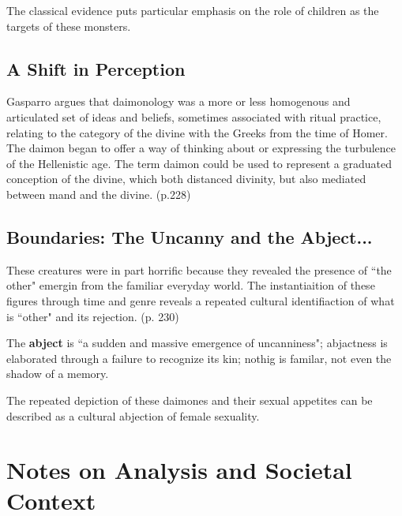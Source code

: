 \begin{nte}
    The classical evidence puts particular emphasis on the role of children as the targets of these monsters.
\end{nte}


\subsection{A Shift in Perception}

Gasparro argues that daimonology was a more or less homogenous and articulated set of ideas and beliefs, sometimes associated with ritual practice, relating to the category of the divine with the Greeks from the time of Homer. The daimon began to offer a way of thinking about or expressing the turbulence of the Hellenistic age. The term daimon could be used to represent a graduated conception of the divine, which both distanced divinity, but also mediated between mand and the divine. (p.228)


\subsection{Boundaries: The Uncanny and the Abject...}

These creatures were in part horrific because they revealed the presence of ``the other" emergin from the familiar everyday world. The instantiaition of these figures through time and genre reveals a repeated cultural identifiaction of what is ``other" and its rejection. (p. 230)


\begin{defn}
    The \textbf{abject} is ``a sudden and massive emergence of uncanniness"; abjactness is elaborated through a failure to recognize its kin; nothig is familar, not even the shadow of a memory.
\end{defn}

\begin{rmk}
    The repeated depiction of these daimones and their sexual appetites can be described as a cultural abjection of female sexuality.
\end{rmk}









\section{Notes on Analysis and Societal Context}
\label{sec:SocCont13}

